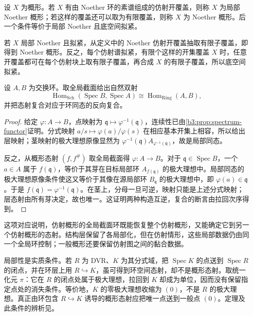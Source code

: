 \begin{definition}\label{b3:def:noetherian-scheme}
	设 \(X\) 为概形。若 \(X\) 有由 Noether 环的素谱组成的仿射开覆盖，则称 \(X\) 为局部 Noether 概形；若这样的覆盖还可以取为有限覆盖，则称 \(X\) 为 Noether 概形。后一个条件等价于局部 Noether 且底空间拟紧。
\end{definition}

若 \(X\) 局部 Noether 且拟紧，从定义中的 Noether 仿射开覆盖抽取有限子覆盖，即得到 Noether 概形。反之，每个仿射谱拟紧，有限个这样的开集覆盖 \(X\) 时，任意开覆盖都可在每个仿射块上取有限子覆盖，再合成 \(X\) 的有限子覆盖，所以底空间拟紧。

\begin{theorem}\label{b3:thm:affine-scheme-hom}
	设 \(A,B\) 为交换环。取全局截面给出自然双射
	\[
		\operatorname{Hom}_{\mathrm{Sch}}(\operatorname{Spec}B,\operatorname{Spec}A) \cong\operatorname{Hom}_{\mathrm{Ring}}(A,B),
	\]
	并把态射复合对应于环同态的反向复合。
\end{theorem}
\begin{proof}
	给定 \(\varphi:A\rightarrow B\)，点映射为 \(\mathfrak q\mapsto\varphi^{-1}(\mathfrak q)\)，连续性已由\cref{b3:prop:spectrum-functor}证明。分式映射 \(a/s\mapsto\varphi(a)/\varphi(s)\) 在相应基本开集上相容，所以给出层映射；茎映射的极大理想原像显然为 \(\varphi^{-1}(\mathfrak q)A_{\varphi^{-1}(\mathfrak q)}\)，故是局部同态。

	反之，从概形态射 \((f,f^\#)\) 取全局截面得 \(\varphi:A\rightarrow B\)。对于 \(\mathfrak q\in\operatorname{Spec}B\)，一个 \(a\in A\) 属于 \(f(\mathfrak q)\)，等价于其芽在目标局部环 \(A_{f(\mathfrak q)}\) 的极大理想中。局部同态的极大理想原像条件使这又等价于其像在源局部环 \(B_{\mathfrak q}\) 的极大理想中，即 \(\varphi(a)\in\mathfrak q\)。于是 \(f(\mathfrak q)=\varphi^{-1}(\mathfrak q)\)。在茎上，分母一旦可逆，映射只能是上述分式映射；层态射由所有芽决定，故也唯一。这证明两种构造互逆，复合的断言由拉回次序得到。
\end{proof}

这项对应说明，仿射概形的全局截面环既能恢复整个仿射概形，又能确定它到另一个仿射概形的态射。结构层保留了各局部化，但在仿射情形，这些局部数据仍由同一个全局环控制；一般概形还要保留仿射图之间的黏合数据。

\ProseParagraphBreak
局部性是实质条件。若 \(R\) 为 DVR、\(K\) 为其分式域，把 \(\operatorname{Spec}K\) 的点送到 \(\operatorname{Spec}R\) 的闭点，并在环层上用 \(R\hookrightarrow K\)，虽可得到环空间态射，却不是概形态射。取统一化元 \(\pi\)：它在 \(R\) 的闭点处属于极大理想，拉回到 \(K\) 却成为单位，因而没有保留指定点处的消失条件。等价地，\(K\) 的零极大理想收缩为 \((0)\)，不是 \(R\) 的极大理想。真正由环包含 \(R\hookrightarrow K\) 诱导的概形态射应把唯一点送到一般点 \((0)\)。定理及此条件的辨析见\cite[Chapter II, Proposition 2.3 and Example 2.3.2, pp. 73--74]{Hartshorne1977}。
